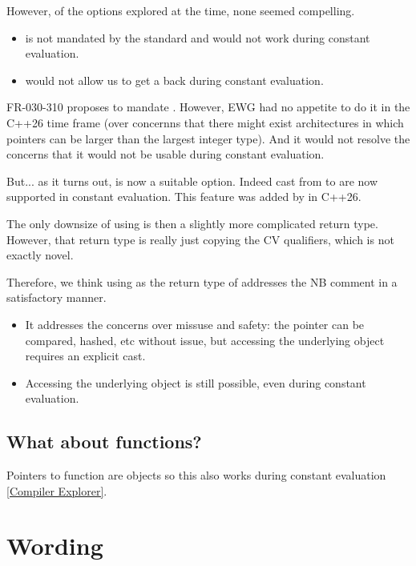 \documentclass{wg21}
\begin{document}
However, of the options explored at the time, none seemed compelling.

\begin{itemize}
\item {} is not mandated by the standard and would not work during constant evaluation.
\item {} would not allow us to get a  back during constant evaluation.
\end{itemize}

FR-030-310 proposes to mandate . However, EWG had no appetite to do it in the C++26 time frame (over concernns that there
might exist architectures in which pointers can be larger than the largest integer type). And it would not resolve the concerns
that it would not be usable during constant evaluation.

But... as it turns out,  is now a suitable option. Indeed cast from  to  are now supported
in constant evaluation. This feature was added by  in C++26.

The only downsize of using  is then a slightly more complicated return type. However, that return type is really just copying the CV qualifiers,
which is not exactly novel.

Therefore, we think using   as the return type of  addresses the NB comment in a satisfactory manner.
\begin{itemize}
\item It addresses the concerns over missuse and safety: the  pointer can be compared, hashed, etc without issue, but
accessing the underlying object requires an explicit cast.
\item Accessing the underlying object is still possible, even during constant evaluation.
\end{itemize}

\subsection{What about functions?}

Pointers to function are objects so this also works during constant evaluation \href{https://godbolt.org/z/h3bWxvPKn}{[Compiler Explorer]}.

\section{Wording}
\end{document}
